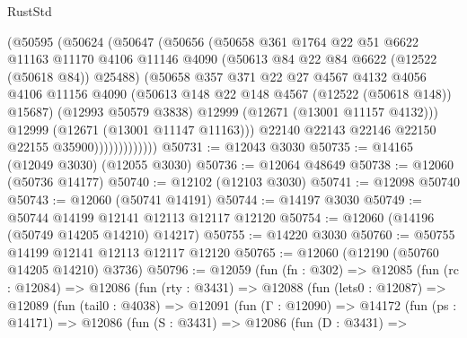 \begin{lexlean}{RustStd}
\begin{coremodule}
                      (@50595
                        (@50624
                          (@50647
                            (@50656
                              (@50658
                                @361
                                @1764
                                @22
                                @51
                                @6622
                                @11163
                                @11170
                                @4106
                                @11146
                                @4090
                                (@50613 @84 @22 @84 @6622 (@12522 (@50618 @84)) @25488)
                                (@50658
                                  @357
                                  @371
                                  @22
                                  @27
                                  @4567
                                  @4132
                                  @4056
                                  @4106
                                  @11156
                                  @4090
                                  (@50613 @148 @22 @148 @4567 (@12522 (@50618 @148)) @15687)
                                  (@12993 @50579 @3838)
                                  @12999
                                  (@12671 (@13001 @11157 @4132)))
                                @12999
                                (@12671 (@13001 @11147 @11163)))
                              @22140
                              @22143
                              @22146
                              @22150
                              @22155
                              @35900)))))))))))))
@50731 := @12043 @3030
@50735 := @14165 (@12049 @3030) (@12055 @3030)
@50736 := @12064 @48649
@50738 := @12060 (@50736 @14177)
@50740 := @12102 (@12103 @3030)
@50741 := @12098 @50740
@50743 := @12060 (@50741 @14191)
@50744 := @14197 @3030
@50749 := @50744 @14199 @12141 @12113 @12117 @12120
@50754 := @12060 (@14196 (@50749 @14205 @14210) @14217)
@50755 := @14220 @3030
@50760 := @50755 @14199 @12141 @12113 @12117 @12120
@50765 := @12060 (@12190 (@50760 @14205 @14210) @3736)
@50796 := @12059
    (fun (fn : @302) =>
    @12085
      (fun (rc : @12084) =>
      @12086
        (fun (rty : @3431) =>
        @12088
          (fun (lets0 : @12087) =>
          @12089
            (fun (tail0 : @4038) =>
            @12091
              (fun (Γ : @12090) =>
              @14172
                (fun (ps : @14171) =>
                @12086
                  (fun (S : @3431) =>
                  @12086
                    (fun (D : @3431) =>

\end{coremodule}
\end{lexlean}

